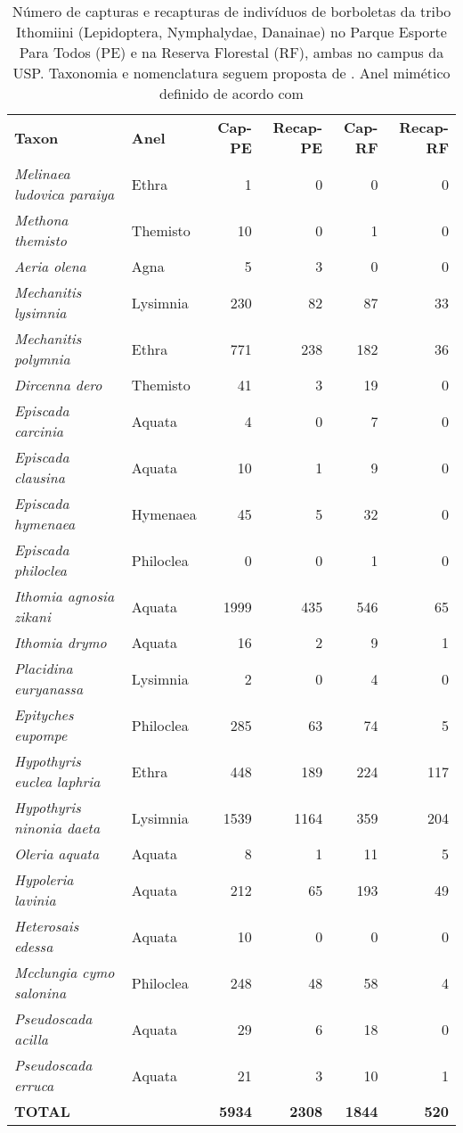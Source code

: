 \begin{table}
\caption{\label{tab:borb1} Número de capturas e recapturas de indivíduos 
de borboletas da tribo
Ithomiini (Lepidoptera, Nymphalydae, Danainae) no Parque
Esporte Para Todos (PE) e na Reserva Florestal (RF), ambas no campus da
USP. Taxonomia e nomenclatura seguem proposta de \cite{Brower_2014}. 
Anel mimético definido de acordo com \citet{Willmott_2004}}
\begin{tabular}{llrrrr}
  \textbf{Taxon} & \textbf{Anel} & \textbf{Cap-PE} & \textbf{Recap-PE} & \textbf{Cap-RF} & \textbf{Recap-RF}\\
 \emph{ Melinaea ludovica paraiya} & Ethra & 1 & 0 & 0 & 0\\
  \emph{Methona themisto} & Themisto & 10 & 0 & 1 & 0\\
  \emph{Aeria olena} & Agna & 5 & 3 & 0 & 0\\
  \emph{Mechanitis lysimnia} & Lysimnia & 230 & 82 & 87 & 33\\
  \emph{Mechanitis polymnia} & Ethra & 771 & 238 & 182 & 36\\
  \emph{Dircenna dero} & Themisto & 41 & 3 & 19 & 0\\
  \emph{Episcada carcinia} & Aquata & 4 & 0 & 7 & 0\\
  \emph{Episcada clausina} & Aquata & 10 & 1 & 9 & 0\\
  \emph{Episcada hymenaea} & Hymenaea & 45 & 5 & 32 & 0\\
  \emph{Episcada philoclea} & Philoclea & 0 & 0 & 1 & 0\\
  \emph{Ithomia agnosia zikani} & Aquata & 1999 & 435 & 546 & 65\\
  \emph{Ithomia drymo} & Aquata & 16 & 2 & 9 & 1\\
  \emph{Placidina euryanassa} & Lysimnia & 2 & 0 & 4 & 0\\
  \emph{Epityches eupompe} & Philoclea & 285 & 63 & 74 & 5\\
  \emph{Hypothyris euclea laphria} & Ethra & 448 & 189 & 224 & 117\\
  \emph{Hypothyris ninonia daeta} & Lysimnia & 1539 & 1164 & 359 & 204\\
  \emph{Oleria aquata} & Aquata & 8 & 1 & 11 & 5\\
  \emph{Hypoleria lavinia} & Aquata & 212 & 65 & 193 & 49\\
  \emph{Heterosais edessa} & Aquata & 10 & 0 & 0 & 0\\
  \emph{Mcclungia cymo salonina} & Philoclea & 248 & 48 & 58 & 4\\
  \emph{Pseudoscada acilla} & Aquata & 29 & 6 & 18 & 0\\
  \emph{Pseudoscada erruca} & Aquata & 21 & 3 & 10 & 1\\
  \textbf{TOTAL} & & \textbf{5934} & \textbf{2308} & \textbf{1844} & \textbf{520}\\
\end{tabular} 
\end{table}